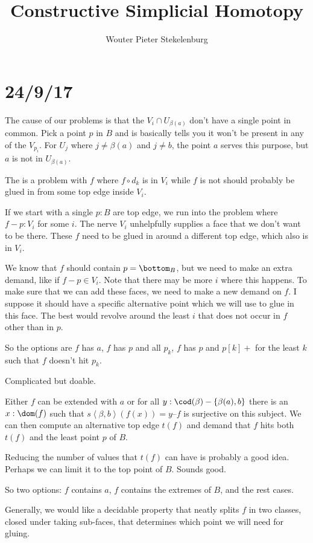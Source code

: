 \documentclass{tac}
\title{Constructive Simplicial Homotopy}
\author{Wouter Pieter Stekelenburg}
\newcommand\set[1]{\left\{#1\right\}}
\newcommand\of{:}
\newcommand\tuplet[1]{\left\langle #1 \right\rangle}
\begin{document}
\section{24/9/17}

The cause of our problems is that the $V_i\cap U_{\beta(a)}$ don't have a single point in common. Pick a point $p$ in $B$ and is basically tells you it won't be present in any of the $V_{p_i}$.
For $U_j$ where $j\neq \beta(a)$ and $j\neq b$, the point $a$ serves this purpose, but $a$ is not in $U_{\beta(a)}$.

The is a problem with $f$ where $f\circ d_k$ is in $V_i$ while $f$ is not should probably be glued in from some top edge inside $V_i$. 

If we start with a single $p\of B$ are top edge, we run into the problem where $f - p\of V_i$ for some $i$. The nerve $V_i$ unhelpfully supplies a face that we don't want to be there.
These $f$ need to be glued in around a different top edge, which also is in $V_i$.

We know that $f$ should contain $p = \bottom_B$, but we need to make an extra demand, like if $f-p\in V_i$. Note that there may be more $i$ where this happens.
To make sure that we can add these faces, we need to make a new demand on $f$. I suppose it should have a specific alternative point which we will use to glue in this face.
The best would revolve around the least $i$ that does not occur in $f$
other than in $p$. 

So the options are $f$ has $a$, $f$ has $p$ and all $p_k$, $f$ has $p$ and $p[k]+$ for the least $k$ such that $f$ doesn't hit $p_k$.

Complicated but doable.

Either $f$ can be extended with $a$ or for all $y\of \cod(\beta)-\set{\beta(a),b}$ there is an $x\of \dom(f)$ such that $s\tuplet{\beta,b}(f(x)) = y$--$f$ is surjective on this subject. We can then compute an alternative top edge $t(f)$ and demand that $f$ hits both $t(f)$ and the least point $p$ of $B$.

Reducing the number of values that $t(f)$ can have is probably a good idea. Perhaps we can limit it to the top point of $B$.
Sounds good.

So two options: $f$ contains $a$, $f$ contains the extremes of $B$, and the rest cases.

Generally, we would like a decidable property that neatly splits $f$ in two classes, closed under taking sub-faces, that determines which point we will need for gluing.
\end{document}

